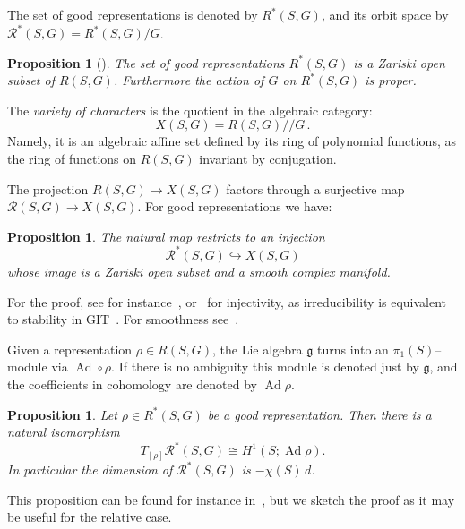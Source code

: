 \documentclass[11pt]{article}
\newtheorem{prop}[theo]{Proposition}
\theoremstyle{definition}
\numberwithin{equation}{section}
\numberwithin{figure}{section}
\numberwithin{table}{section}
\DeclareMathOperator{\Ad}{Ad}
\newcommand{\Rcal}{\mathcal{R}}
\newcommand{\gfrk}{\mathfrak{g}}
\newcommand*\dG{{d}}
\newcommand*\Rg{\Rcal^*}
\begin{document}
The set of good representations is denoted by $R^*(S,G)$, and its orbit space by $\Rg(S,G) = R^*(S,G)/G$.



\begin{prop}[{\cite[Propositions~1.2 and~1.3]{JohnsonMillson}}]
The set of good representations $R^*(S,G)$ is a Zariski open subset of $R(S,G)$. Furthermore the action of $G$ on $R^*(S,G)$ is proper.
\end{prop}



The \emph{variety of characters} is the quotient in the algebraic category:
\[
X(S,G)=R(S,G)/\!\!/ G\,.
\]
Namely, it is an algebraic affine set defined by its ring of polynomial functions, as the ring of functions on $R(S,G)$ invariant by conjugation.

The projection $R(S,G)\to X(S,G)$ factors through a surjective map $\Rcal(S,G)\to X(S,G)$. For good representations we have:

\begin{prop}\label{Prop:smoothvariety}
The natural map restricts to an injection
\[
\Rg(S,G)\hookrightarrow X(S,G)
\]
whose image is a Zariski open subset and a smooth complex manifold.
\end{prop}

For the proof, see for instance~\cite[Section~1]{JohnsonMillson}, or~\cite[Proposition~3.8]{Newstead} for injectivity, as irreducibility is equivalent to stability in GIT~\cite[Section~1]{JohnsonMillson}. For smoothness see~\cite{GoldmanAdvances}.


Given a representation $\rho\in R(S,G)$, the Lie algebra $\gfrk$ turns into an $\pi_1(S)$--module via $\Ad\circ \rho$. If there is no ambiguity this module is denoted just by $\gfrk$, and the coefficients in cohomology are denoted by $\Ad\rho$.

\begin{prop}\label{Prop:tangentspace}
Let $\rho\in R^*(S,G)$ be a good representation. Then there is a natural isomorphism
\[
T_{[\rho]}\Rg(S,G)\cong H^1(S;\Ad\rho).
\]
In particular the dimension of $\Rg(S,G)$ is $-\chi(S)\, \dG$.
\end{prop}


This proposition can be found for instance in~\cite[Corollary~50]{Sikora12}, but we sketch the proof as it may be useful for the relative case.
\end{document}
